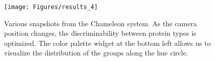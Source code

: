 \documentclass{egpubl}
\begin{document}
	
	
	
		\begin{figure}[t]
			\centering
			\texttt{[image: Figures/results\_4]}
			\caption{Various snapshots from the Chameleon system.
				As the camera position changes, the discriminability between protein types is optimized.
				The color palette widget at the bottom left allows us to visualize the distribution of the groups along the hue circle.}
			\label{fig:results_1}
		\end{figure}
		
\end{document}
